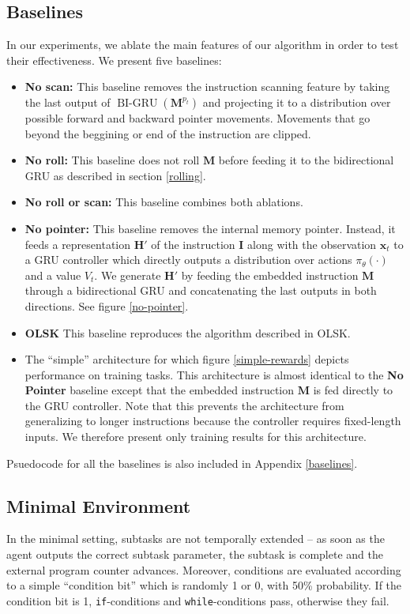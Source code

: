 \documentclass{article}
\DeclareMathOperator{\BIGRU}{BI-GRU}
\begin{document}
\subsection{Baselines}
In our experiments, we ablate the main features of our algorithm in order to
test their effectiveness. We present five baselines:
\begin{itemize}
  \item \textbf{No scan:} This baseline removes the instruction scanning feature by
    taking the last output of $\BIGRU(\mathbf{M}^{p_t})$ and projecting it to
    a distribution over possible forward and backward pointer movements.
    Movements that go beyond the beggining or end of the instruction are clipped.
  \item \textbf{No roll:} This baseline does not roll $\mathbf{M}$ before feeding
    it to the bidirectional GRU as described in section \ref{rolling}.
  \item \textbf{No roll or scan:} This baseline combines both ablations.
  \item \textbf{No pointer:} This baseline removes the internal memory pointer.
    Instead, it feeds a representation $\mathbf{H}'$ of the instruction
    $\mathbf{I}$ along with the observation $\mathbf{x}_t$ to a GRU controller
    which directly outputs a distribution over actions $\pi_\theta(\cdot)$ and a
    value $V_t$. We generate $\mathbf{H}'$ by feeding the embedded instruction
    $\mathbf{M}$ through a bidirectional GRU and concatenating the last outputs
    in both directions. See figure \ref{no-pointer}. 
  \item \textbf{OLSK} This baseline reproduces the algorithm described in
    OLSK.
  \item The ``simple'' architecture for which figure
    \ref{simple-rewards} depicts performance on training tasks. This
    architecture is almost identical to the \textbf{No Pointer} baseline except
    that the embedded instruction $\mathbf{M}$ is fed directly to the GRU
    controller. Note that this prevents the architecture from generalizing to
    longer instructions because the controller requires fixed-length inputs. We
    therefore present only training results for this architecture.
\end{itemize}
Psuedocode for all the baselines is also included in Appendix \ref{baselines}.

\subsection{Minimal Environment}
In the minimal setting, subtasks are not
temporally extended -- as soon as the agent outputs the correct subtask
parameter, the subtask is complete and the external program counter advances.
Moreover, conditions are evaluated according to a simple ``condition bit'' which
is randomly 1 or 0, with 50\% probability. If the condition bit is 1,
\texttt{if}-conditions and \texttt{while}-conditions pass, otherwise they fail.
\end{document}
